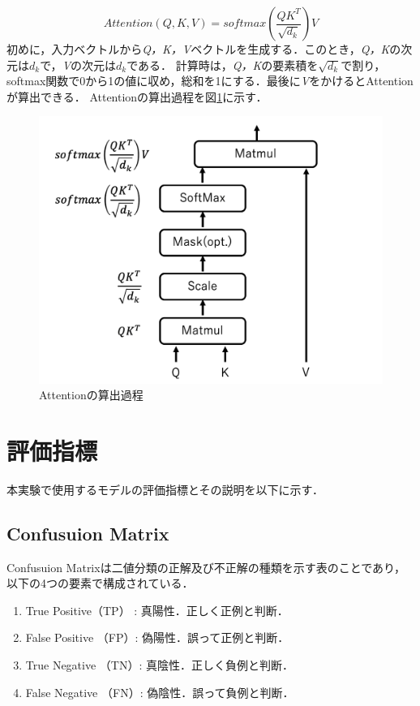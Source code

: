 \documentclass[a4paper, oneside, openany, dvipdfmx]{suribt}%
\newcommand{\fref}[1]{図\ref{#1}}
\begin{document}
\begin{equation}
  Attention(Q,K,V) = softmax(\frac{QK^{T}}{\sqrt{d_{k}}})V
  \label{eq:network-input5}
\end{equation}
初めに，入力ベクトルから\textit{Q，K，V}ベクトルを生成する．このとき，\textit{Q，K}の次元は$d_{k}$で，\textit{V}の次元は$d_{k}$である．
計算時は，\textit{Q，K}の要素積を$\sqrt{d_{k}}$で割り，softmax関数で0から1の値に収め，総和を1にする．最後に\textit{V}をかけるとAttentionが算出できる．
Attentionの算出過程を\fref{fig:attention}に示す．
\begin{figure}[h]
  \centering
  \includegraphics[width=0.9\linewidth]{figs/attention.png}
  \caption{Attentionの算出過程}
  \label{fig:attention}
\end{figure}

\section{評価指標}
本実験で使用するモデルの評価指標とその説明を以下に示す．
\subsection{Confusuion Matrix}
Confusuion Matrixは二値分類の正解及び不正解の種類を示す表のことであり，以下の4つの要素で構成されている．
\begin{enumerate}
  \item True Positive（TP） : 真陽性．正しく正例と判断．
  \item False Positive （FP）: 偽陽性．誤って正例と判断．
  \item True Negative （TN）: 真陰性．正しく負例と判断．
  \item False Negative （FN）: 偽陰性．誤って負例と判断．
\end{enumerate}
\end{document}
